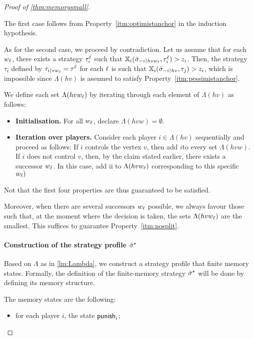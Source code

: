 \begin{proof}[Proof of \cref{thm:memorysmall}]
\begin{claimproof}
    \begin{claimproof}
        The first case follows from Property~\ref{itm:optimistanchor} in the induction hypothesis.
    
        As for the second case, we proceed by contradiction.
        Let us assume that for each $w_\ell$, there exists a strategy $\tau_i^\ell$ such that $\mathbb{X}_i({\bar{\sigma}}_{-i\upharpoonright hvw_\ell}, \tau^\ell_i) > z_i$.
        Then, the strategy $\tau_i$ defined by $\tau_{i\upharpoonright vw_\ell} = \tau^\ell$ for each $\ell$ is such that $\mathbb{X}_i({\bar{\sigma}}_{-i\upharpoonright hv}, \tau_j) > z_i$, which is impossible since $\Lambda(hv)$ is assumed to satisfy Property~\ref{itm:pessimistanchor}.
    \end{claimproof}

    We define each set $\Lambda(hvw_\ell)$ by iterating through each element of $\Lambda(hv)$ as follows:
    \begin{itemize}
        \item \textbf{Initialisation.} For all $w_\ell$, declare $\Lambda(hvw) = \emptyset$.
        \item \textbf{Iteration over players.} Consider each player $i\in \Lambda(hv)$ sequentially and proceed as follows:
        If $i$ controls the vertex $v$, then add $i$to every set $\Lambda(hvw)$.
        If $i$ does not control $v$, then, by the claim stated earlier, there exists a successor $w_\ell$. In this case, add ii to $\Lambda(hvw_\ell)$ corresponding to this specific $w_\ell)$
    \end{itemize}
    
    Not that the first four properties are thus guaranteed to be satisfied.

    Moreover, when there are several successors $w_\ell$ possible, we always favour those such that, at the moment where the decision is taken, the sets $\Lambda(hvw_\ell)$ are the smallest.
    This suffices to guarantee Property~\ref{itm:nosplit}.
    \end{claimproof}




\paragraph*{Construction of the strategy profile ${\bar{\sigma}}^\star$}
Based on $\Lambda$ as in \cref{lm:Lambda}, we construct a strategy profile that finite memory states. 
Formally, the definition of the finite-memory strategy ${\bar{\sigma}}^\star$ will be done by defining its memory structure.

The memory states are the following:
    \begin{itemize}    
        \item for each player $i$, the state $\mathsf{punish}_i$;


\end{itemize}
\end{proof}
